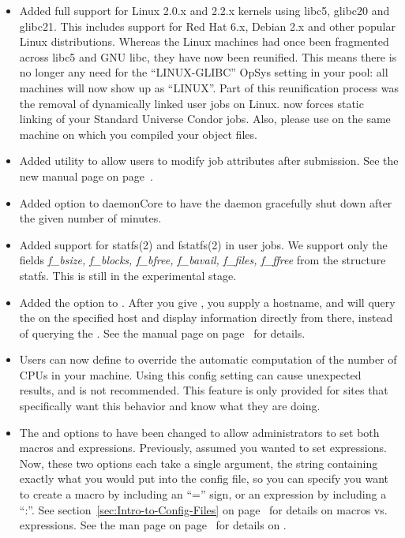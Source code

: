 \begin{itemize}

\item Added full support for Linux 2.0.x and 2.2.x kernels using
libc5, glibc20 and glibc21.
This includes support for Red Hat 6.x, Debian 2.x and other popular
Linux distributions.
Whereas the Linux machines had once been fragmented across libc5 and
GNU libc, they have now been reunified.
This means there is no longer any need for the ``LINUX-GLIBC'' OpSys
setting in your pool: all machines will now show up as ``LINUX''.
Part of this reunification process was the removal of dynamically
linked user jobs on Linux.
 now forces static linking of your Standard Universe
Condor jobs. 
Also, please use  on the same machine on which you
compiled your object files.

\item Added  utility to allow users to modify job
attributes after submission.  See the new manual page on
page~\pageref{man-condor-qedit}.

\item Added  option to daemonCore to have
the daemon gracefully shut down after the given number of minutes.

\item Added support for statfs(2) and fstatfs(2) in user jobs. We support 
only the fields
\textit{f\_bsize, f\_blocks, f\_bfree, f\_bavail, f\_files, f\_ffree} from
the structure statfs. This is still in the experimental stage.

\item Added the  option to .
After you give , you supply a hostname, and
 will query the  on the specified host
and display information directly from there, instead of querying the
.
See the manual page on page~\pageref{man-condor-submit} for details. 

\item Users can now define  to override the automatic
computation of the number of CPUs in your machine.
Using this config setting can cause unexpected results, and is not
recommended. 
This feature is only provided for sites that specifically want this
behavior and know what they are doing.

\item The  and  options to 
have been changed to allow administrators to set both macros and
expressions.
Previously,  assumed you wanted to set
expressions.
Now, these two options each take a single argument, the string
containing exactly what you would put into the config file, so you can
specify you want to create a macro by including an ``='' sign, or an
expression by including a ``:''.
See section~\ref{sec:Intro-to-Config-Files} on
page~\pageref{sec:Intro-to-Config-Files} for details on macros
vs. expressions.
See the  man page on
page~\pageref{man-condor-config-val} for details on
.  


\end{itemize}
